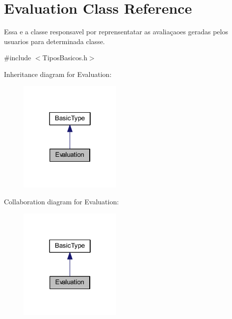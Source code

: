 \hypertarget{class_evaluation}{\section{Evaluation Class Reference}
\label{class_evaluation}
}


Essa e a classe responsavel por reprensentatar as avaliaçaoes geradas pelos usuarios para determinada classe.  




{\ttfamily \#include $<$Tipos\-Basicos.\-h$>$}



Inheritance diagram for Evaluation\-:\nopagebreak
\begin{figure}[H]
\begin{center}
\leavevmode
\includegraphics[width=142pt]{class_evaluation__inherit__graph}
\end{center}
\end{figure}


Collaboration diagram for Evaluation\-:\nopagebreak
\begin{figure}[H]
\begin{center}
\leavevmode
\includegraphics[width=142pt]{class_evaluation__coll__graph}
\end{center}
\end{figure}
